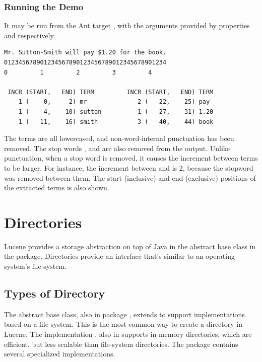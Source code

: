 \subsubsection{Running the Demo}

It may be run from the Ant target , with
the arguments provided by properties  and 
 respectively.

\begin{verbatim}
Mr. Sutton-Smith will pay $1.20 for the book.
012345678901234567890123456789012345678901234
0         1         2         3         4

 INCR (START,   END) TERM         INCR (START,   END) TERM
    1 (    0,     2) mr              2 (   22,    25) pay
    1 (    4,    10) sutton          1 (   27,    31) 1.20
    1 (   11,    16) smith           3 (   40,    44) book
\end{verbatim}
%
The terms are all lowercased, and non-word-internal punctuation has
been removed.  The stop words , 
and  are also removed from the output.  Unlike
punctuation, when a stop word is removed, it causes the increment
between terms to be larger.  For instance, the increment between
 and  is 2, because the stopword
 was removed between them.  The start (inclusive)
and end (exclusive) positions of the extracted terms is also shown.


\section{Directories}\label{section:lucene-directory}

Lucene provides a storage abstraction on top of Java in the abstract
base class  in the 
package.  Directories provide an interface that's similar to an
operating system's file system.

\subsection{Types of Directory}

The  abstract base class, also in package
, extends  to support implementations
based on a file system.  This is the most common way to create a
directory in Lucene.  The implementation , also in
 supports in-memory directories, which are efficient, but
less scalable than file-system directories.  The package
 contains several specialized
implementations.

